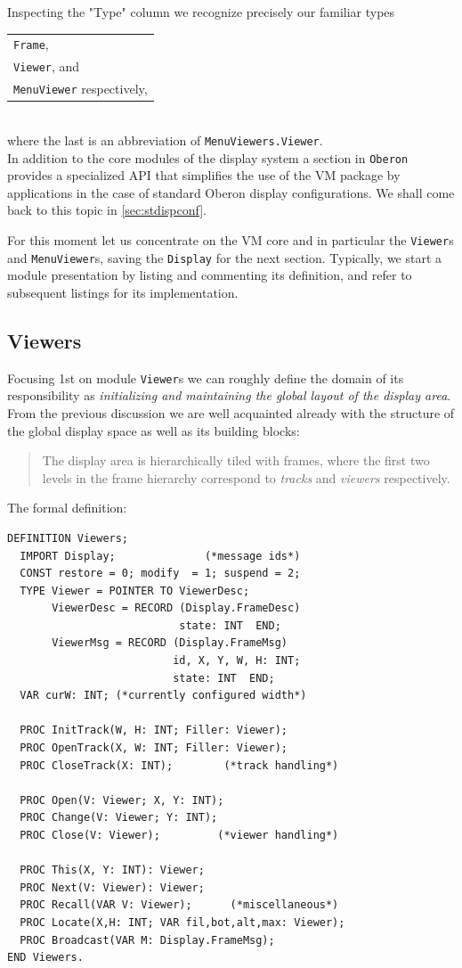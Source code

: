 Inspecting the "Type" column we recognize precisely our familiar types
\begin{table}[h!]
  \centering
  \begin{tabular}{l}
    \verb|Frame|, \\
    \verb|Viewer|, and \\
    \verb|MenuViewer| respectively,
  \end{tabular}
\end{table}
\\where the last is an abbreviation of \verb|MenuViewers.Viewer|.
\\In addition to the core modules of the display system
a section in \verb|Oberon| provides a specialized API that simplifies the use of the VM package
by applications in the case of standard Oberon display configurations.
We shall come back to this topic in \textsection \ref{sec:stdispconf}.

For this moment let us concentrate on the VM core and in particular the \verb|Viewer|s
and \verb|MenuViewer|s, saving the \verb|Display| for the next section.
Typically, we start a module presentation by listing and commenting its definition,
and refer to subsequent listings for its implementation.

\subsection{Viewers}
Focusing 1st on module \verb|Viewer|s we can roughly define the domain of its responsibility as
\emph{initializing and maintaining the global layout of the display area}.  From the previous discussion
we are well acquainted already with the structure of the global display space as well as its building blocks:
\begin{quote}
The display area is hierarchically tiled with frames, where the first two levels
in the frame hierarchy correspond to \emph{tracks} and \emph{viewers} respectively.
\end{quote}
The formal definition:
\begin{verbatim}
DEFINITION Viewers;
  IMPORT Display;              (*message ids*)
  CONST restore = 0; modify  = 1; suspend = 2;
  TYPE Viewer = POINTER TO ViewerDesc;
       ViewerDesc = RECORD (Display.FrameDesc)
                           state: INT  END;
       ViewerMsg = RECORD (Display.FrameMsg)
                          id, X, Y, W, H: INT;
                          state: INT  END;
  VAR curW: INT; (*currently configured width*)

  PROC InitTrack(W, H: INT; Filler: Viewer);
  PROC OpenTrack(X, W: INT; Filler: Viewer);
  PROC CloseTrack(X: INT);        (*track handling*)

  PROC Open(V: Viewer; X, Y: INT);
  PROC Change(V: Viewer; Y: INT);
  PROC Close(V: Viewer);         (*viewer handling*)

  PROC This(X, Y: INT): Viewer;
  PROC Next(V: Viewer): Viewer;
  PROC Recall(VAR V: Viewer);      (*miscellaneous*)
  PROC Locate(X,H: INT; VAR fil,bot,alt,max: Viewer);
  PROC Broadcast(VAR M: Display.FrameMsg);
END Viewers.
\end{verbatim}

